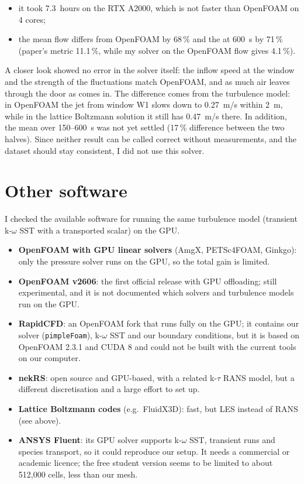 \begin{itemize}
  \item it took 7.3~hours on the RTX A2000, which is not faster than OpenFOAM on 4 cores;
  \item the mean flow differs from OpenFOAM by 68\,\% and the \cotwo{} at 600~s by 71\,\% (paper's metric
        11.1\,\%, while my \cotwo{} solver on the OpenFOAM flow gives 4.1\,\%).
\end{itemize}

A closer look showed no error in the solver itself: the inflow speed at the window and the strength of the
fluctuations match OpenFOAM, and as much air leaves through the door as comes in. The difference comes from the turbulence model: in OpenFOAM the jet
from window W1 slows down to 0.27~m/s within 2~m, while in the lattice Boltzmann solution it still has 0.47~m/s
there. In addition, the mean over 150--600~s was not yet settled (17\,\% difference between the two halves). Since
neither result can be called correct without measurements, and the dataset should stay consistent, I did not use
this solver.

\section{Other software}
I checked the available software for running the same turbulence model (transient k-$\omega$ SST with a
transported scalar) on the GPU. 
\begin{itemize}
  \item \textbf{OpenFOAM with GPU linear solvers} (AmgX, PETSc4FOAM, Ginkgo): only the pressure solver runs on the
        GPU, so the total gain is limited.
  \item \textbf{OpenFOAM v2606}: the first official release with GPU offloading; still experimental, and it is
        not documented which solvers and turbulence models run on the GPU.
  \item \textbf{RapidCFD}: an OpenFOAM fork that runs fully on the GPU; it contains our solver
        (\texttt{pimpleFoam}), k-$\omega$ SST and our boundary conditions, but it is based on OpenFOAM 2.3.1 and CUDA 8 and could not be
        built with the current tools on our computer.
  \item \textbf{nekRS}: open source and GPU-based, with a related k-$\tau$ RANS model, but a different
        discretisation and a large effort to set up.
  \item \textbf{Lattice Boltzmann codes} (e.g.\ FluidX3D): fast, but LES instead of RANS (see above).
  \item \textbf{ANSYS Fluent}: its GPU solver supports k-$\omega$ SST, transient runs and species transport, so it
        could reproduce our setup. It needs a commercial or academic licence; the free student version seems to be
        limited to about 512,000 cells, less than our mesh. 
\end{itemize}
